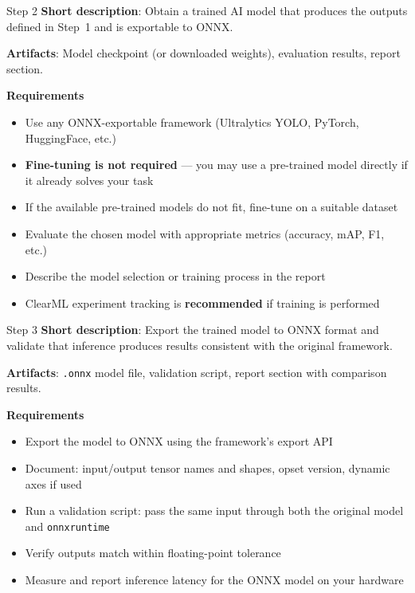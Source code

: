 \documentclass[aspectratio=169]{beamer}
\begin{document}
\begin{frame}[t]{Step 2}
\vspace{-0.3cm}
\textbf{Short description}: Obtain a trained AI model that produces the outputs defined in Step~1 and is exportable to ONNX.

\textbf{Artifacts}: Model checkpoint (or downloaded weights), evaluation results, report section.

\textbf{Requirements}
\footnotesize
\begin{itemize}
    \item Use any ONNX-exportable framework (Ultralytics YOLO, PyTorch, HuggingFace, etc.)
    \item \textbf{Fine-tuning is not required} --- you may use a pre-trained model directly if it already solves your task
    \item If the available pre-trained models do not fit, fine-tune on a suitable dataset
    \item Evaluate the chosen model with appropriate metrics (accuracy, mAP, F1, etc.)
    \item Describe the model selection or training process in the report
    \item ClearML experiment tracking is \textbf{recommended} if training is performed
\end{itemize}
\end{frame}

\begin{frame}[t]{Step 3}
\vspace{-0.3cm}
\textbf{Short description}: Export the trained model to ONNX format and validate that inference produces results consistent with the original framework.

\textbf{Artifacts}: \texttt{.onnx} model file, validation script, report section with comparison results.

\textbf{Requirements}
\footnotesize
\begin{itemize}
    \item Export the model to ONNX using the framework's export API
    \item Document: input/output tensor names and shapes, opset version, dynamic axes if used
    \item Run a validation script: pass the same input through both the original model and \texttt{onnxruntime}
    \item Verify outputs match within floating-point tolerance
    \item Measure and report inference latency for the ONNX model on your hardware
\end{itemize}
\end{frame}
\end{document}
